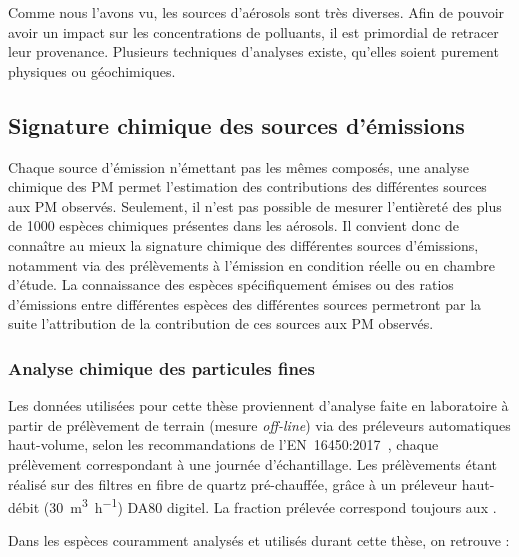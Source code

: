 Comme nous l'avons vu, les sources d'aérosols sont très diverses.
Afin de pouvoir avoir un impact sur les concentrations de polluants, il est primordial de
retracer leur provenance. Plusieurs techniques d'analyses existe, qu'elles soient purement
physiques ou géochimiques.

\subsection{Signature chimique des sources d'émissions}%
\label{sec:signature_chimique_des_sources_demissions}

Chaque source d'émission n'émettant pas les mêmes composés, une analyse chimique
des PM permet l'estimation des contributions des différentes sources aux PM observés.
Seulement, il n'est pas possible de mesurer l'entièreté des plus de 1000 espèces chimiques présentes
dans les aérosols.
Il convient donc de connaître au mieux la signature chimique des différentes sources
d'émissions, notamment via des prélèvements à l'émission en condition
réelle ou en chambre d'étude. La connaissance des espèces spécifiquement émises ou des
ratios d'émissions entre différentes espèces des différentes sources permetront par la
suite l'attribution de la contribution de ces sources aux PM observés.

\subsubsection{Analyse chimique des particules fines}%
\label{ssub:analyse_chimique_des_particules_fines}

Les données utilisées pour cette thèse proviennent d'analyse faite en laboratoire à
partir de prélèvement de terrain (mesure \textit{off-line}) via des préleveurs
automatiques haut-volume, selon les recommandations de
l'EN~16450:2017~\autocite{cenAmbient2017a}, chaque prélèvement correspondant à une
journée d'échantillage. Les prélèvements étant réalisé sur des filtres en fibre de quartz
pré-chauffée, grâce à un préleveur haut-débit (\SI{30}{\cubic\m\per\hour}) DA80 digitel.
La fraction prélevée correspond toujours aux \PMdix{}.

Dans les espèces couramment analysés et utilisés durant cette thèse, on retrouve :

